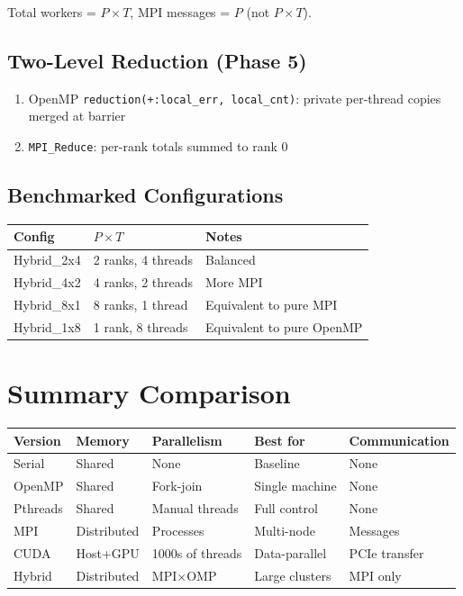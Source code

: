 \documentclass[12pt,a4paper]{report}
\begin{document}
Total workers = $P \times T$, MPI messages = $P$ (not $P \times T$).

\section{Two-Level Reduction (Phase 5)}

\begin{enumerate}
    \item OpenMP \texttt{reduction(+:local\_err, local\_cnt)}: private per-thread copies merged at barrier
    \item \texttt{MPI\_Reduce}: per-rank totals summed to rank 0
\end{enumerate}

\section{Benchmarked Configurations}

\begin{center}
\begin{tabular}{lll}
\toprule
Config & $P \times T$ & Notes \\
\midrule
Hybrid\_2x4 & 2 ranks, 4 threads & Balanced \\
Hybrid\_4x2 & 4 ranks, 2 threads & More MPI \\
Hybrid\_8x1 & 8 ranks, 1 thread & Equivalent to pure MPI \\
Hybrid\_1x8 & 1 rank, 8 threads & Equivalent to pure OpenMP \\
\bottomrule
\end{tabular}
\end{center}

\chapter*{Summary Comparison}

\begin{center}
\begin{tabular}{lllll}
\toprule
Version & Memory & Parallelism & Best for & Communication \\
\midrule
Serial & Shared & None & Baseline & None \\
OpenMP & Shared & Fork-join & Single machine & None \\
Pthreads & Shared & Manual threads & Full control & None \\
MPI & Distributed & Processes & Multi-node & Messages \\
CUDA & Host+GPU & 1000s of threads & Data-parallel & PCIe transfer \\
Hybrid & Distributed & MPI$\times$OMP & Large clusters & MPI only \\
\bottomrule
\end{tabular}
\end{center}
\end{document}
